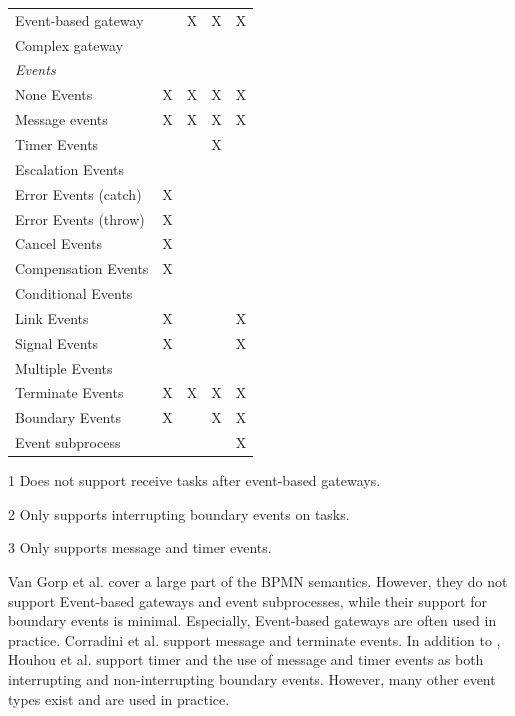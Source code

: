\documentclass[submission, copyright, creativecommons]{eptcs}
\begin{document}
\begin{table}[htbp]
\begin{threeparttable}
\begin{tabular}{l l l l l}
      Event-based gateway &  & X\tnote{1} & X & X\\ %
      Complex gateway & & & &\\
      \textit{Events} & & & & \\
      None Events & X & X & X & X\\
      Message events & X & X & X & X\\
      Timer Events & & & X & \\
      Escalation Events & & & & \\
      Error Events (catch) & X & & &\\
      Error Events (throw) & X & & &\\
      Cancel Events & X & & &\\
      Compensation Events & X & & &\\
      Conditional Events & & & &\\
      Link Events & X & & & X\\
      Signal Events & X & & & X\\
      Multiple Events &  & & & \\
      Terminate Events & X & X & X & X\\
     Boundary Events & X\tnote{2} & & X\tnote{3} & X\\ %
      Event subprocess &  &  &  & X\\
    \end{tabular}
    \begin{tablenotes}
        \item[1] Does not support receive tasks after event-based gateways.
        \item[2] Only supports interrupting boundary events on tasks.
        \item[3] Only supports message and timer events.
    \end{tablenotes}
    \end{threeparttable}
\end{table}

Van Gorp et al. \cite{vangorpVisualTokenbasedFormalization2013} cover a large part of the BPMN semantics.
However, they do not support Event-based gateways and event subprocesses, while their support for boundary events is minimal.
Especially, Event-based gateways are often used in practice.
Corradini et al. \cite{corradiniFormalApproachAnalysis2021} support message and terminate events.
In addition to \cite{corradiniFormalApproachAnalysis2021}, Houhou et al. \cite{houhouFirstOrderLogicVerification2022} support timer and the use of message and timer events as both interrupting and non-interrupting boundary events.
However, many other event types exist and are used in practice.
\end{document}
